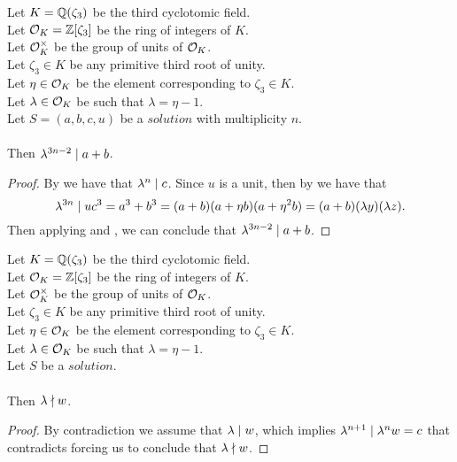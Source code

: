 \begin{lemma}
    \label{lmm:lambda_pow_dvd_a_add_b}
    \leanok
    Let $K = \mathbb{Q}(\zeta_3)$ be the third cyclotomic field. \\
    Let $\mathcal{O}_K = \mathbb{Z}[\zeta_3]$ be the ring of integers of $K$. \\
    Let $\mathcal{O}^\times_K$ be the group of units of $\mathcal{O}_K$. \\
    Let $\zeta_3 \in K$ be any primitive third root of unity. \\
    Let $\eta \in \mathcal{O}_K$ be the element corresponding to $\zeta_3 \in K$. \\
    Let $\lambda \in \mathcal{O}_K$ be such that $\lambda = \eta -1$. \\
    Let $S=(a, b, c, u)$ be a $solution$ with multiplicity $n$.\\\\
    Then $\lambda^{3n -2} \mid a + b$.
\end{lemma}
\begin{proof}
    \leanok
    By  we have that $\lambda^n \mid c$.
    Since $u$ is a unit, then by  we have that
    $$\lambda^{3n} \mid u  c^3 = a^3 + b^3 = (a+b)(a + \eta b)(a + \eta^2 b)
    = (a+b)(\lambda y)(\lambda z).$$
    Then applying  and , we can conclude
    that $\lambda^{3n-2} \mid a+b$.
\end{proof}

\begin{lemma}
    \label{lmm:lambda_not_dvd_w}
    \leanok
    Let $K = \mathbb{Q}(\zeta_3)$ be the third cyclotomic field. \\
    Let $\mathcal{O}_K = \mathbb{Z}[\zeta_3]$ be the ring of integers of $K$. \\
    Let $\mathcal{O}^\times_K$ be the group of units of $\mathcal{O}_K$. \\
    Let $\zeta_3 \in K$ be any primitive third root of unity. \\
    Let $\eta \in \mathcal{O}_K$ be the element corresponding to $\zeta_3 \in K$. \\
    Let $\lambda \in \mathcal{O}_K$ be such that $\lambda = \eta -1$. \\
    Let $S$ be a $solution$.\\\\
    Then $\lambda \nmid w$.
\end{lemma}
\begin{proof}
    \leanok
    By contradiction we assume that $\lambda \mid w$, which implies
    $\lambda^{n+1} \mid \lambda^n  w = c$ that contradicts 
    forcing us to conclude that $\lambda \nmid w$.
\end{proof}

